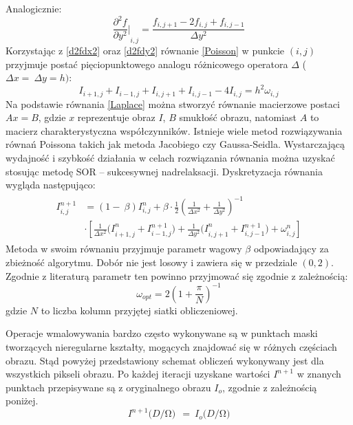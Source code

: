 \documentclass[12pt, twoside, openany]{report}
\theoremstyle{definition}
\begin{document}
Analogicznie:
\begin{equation}
{\frac{{\partial }^2f}{\partial y^2}\mathrm{|}}_{i,j}\mathrm{=}\frac{f_{i,j+1}-2f_{i,j}+f_{i,j-1}}{\Delta y^2}
\label{d2fdy2}
\end{equation}
Korzystając z \eqref{d2fdx2} oraz \eqref{d2fdy2} równanie \eqref{Poisson} w punkcie $(i,j)$ przyjmuje postać pięciopunktowego analogu różnicowego operatora $\Delta $ ($\Delta x=\ \Delta y=h)$:
\begin{equation}
I_{i+1,j}+I_{i-1,j}+I_{i,j+1}+I_{i,j-1}-4I_{i,j}=h^2{\omega }_{i,j}
\label{Laplace}
\end{equation}
Na podstawie równania \eqref{Laplace} można stworzyć równanie macierzowe postaci $Ax=B$, gdzie $x$ reprezentuje obraz $I$, $B$ smukłość obrazu, natomiast $A$ to macierz charakterystyczna współczynników. Istnieje wiele metod rozwiązywania równań Poissona takich jak metoda Jacobiego czy Gaussa-Seidla.  Wystarczającą wydajność i szybkość działania w celach rozwiązania równania można uzyskać stosując metodę SOR – sukcesywnej nadrelaksacji. Dyskretyzacja równania wygląda następująco:
\begin{align}
\begin{aligned}
I^{n+1}_{i,j}
&= \left(1-\ \beta \right)I^n_{i,j}+\beta \cdot \frac{1}{2}{\left(\frac{1}{\Delta x^2}+\frac{1}{\Delta y^2}\right)}^{-1}\\[1ex]
&\cdot \left[\frac{1}{\Delta x^2}{(I}^n_{i+1,j}+I^{n+1}_{i-1,j})+\frac{1}{\Delta y^2}{(I}^n_{i,j+1}+I^{n+1}_{i,j-1})+{\omega }^n_{i,j}\right]
\end{aligned}
\label{DiscreteSOR}
\end{align}
Metoda w swoim równaniu przyjmuje parametr wagowy $\beta$ odpowiadający za zbieżność algorytmu. Dobór nie jest losowy i zawiera się w przedziale $(0,2)$. Zgodnie z literaturą parametr ten powinno przyjmować się zgodnie z zależnością:
\begin{equation}
{\omega }_{opt}=2{\left(1+\frac{\pi }{N}\right)}^{-1}
\label{BetaChoose}
\end{equation}
gdzie $N$ to liczba kolumn przyjętej siatki obliczeniowej. 
\par
Operacje wmalowywania bardzo często wykonywane są w punktach maski tworzących nieregularne kształty, mogących znajdować się w różnych częściach obrazu. Stąd powyżej przedstawiony schemat obliczeń wykonywany jest dla wszystkich pikseli obrazu. Po każdej iteracji uzyskane wartości $I^{n+1}$ w znanych punktach przepisywane są z oryginalnego obrazu $I_{o}$, zgodnie z zależnością poniżej.
\begin{equation}
I^{n+1}(D/\mathrm{\Omega }\mathrm{)\ }\ ={\ I}_o(D/\mathrm{\Omega }\mathrm{)}
\label{retrieveMask}
\end{equation}
\end{document}
